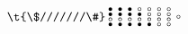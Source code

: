 \begin{equation}\label{eq:bitmap}
\renewcommand{\arraystretch}{0.1}
    \t{\$///////\#}\begin{array}{@{}c@{}}
    \text\textbullet\\
    \text\textbullet\\
    \text\textopenbullet\\
    \text\textbullet
    \end{array}
    \begin{array}{@{}c@{}}
    \text\textbullet\\
    \text\textbullet\\
    \text\textopenbullet\\
    \text\textbullet
    \end{array}
    \begin{array}{@{}c@{}}
    \text\textbullet\\
    \text\textbullet\\
    \text\textopenbullet\\
    \text\textbullet
    \end{array}
    \begin{array}{@{}c@{}}
    \text\textopenbullet\\
    \text\textbullet\\
    \text\textopenbullet\\
    \text\textbullet
    \end{array}
    \begin{array}{@{}c@{}}
    \text\textopenbullet\\
    \text\textopenbullet\\
    \text\textopenbullet\\
    \text\textbullet
    \end{array}
    \begin{array}{@{}c@{}}
    \text\textopenbullet\\
    \text\textopenbullet\\
    \text\textopenbullet\\
    \text\textopenbullet
    \end{array}
    \begin{array}{@{}c@{}}
    \text\textopenbullet\\
    \text\textopenbullet\\
    \text\textopenbullet\\
    \text\textopenbullet
    \end{array}
    \begin{array}{@{}c@{}}
    \text\textopenbullet\\

\end{array}
\end{equation}
